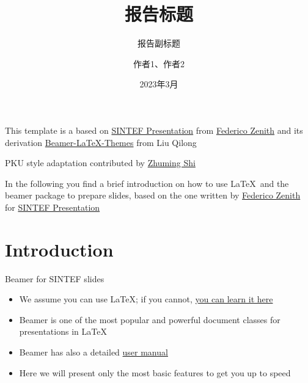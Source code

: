 \documentclass{beamer}
\title{报告标题}
\subtitle{报告副标题}
\author{作者1、作者2}
\date{2023年3月}
\newcommand{\hrefcol}[2]{\textcolor{cyan}{\href{#1}{#2}}}
\begin{document}
\maketitle

\begin{frame}

This template is a based on \hrefcol{https://www.overleaf.com/latex/templates/sintef-presentation/jhbhdffczpnx}{SINTEF Presentation} from \hrefcol{mailto:federico.zenith@sintef.no}{Federico Zenith} and its derivation \hrefcol{https://github.com/TOB-KNPOB/Beamer-LaTeX-Themes}{Beamer-LaTeX-Themes} from Liu Qilong

\vspace{\baselineskip}

PKU style adaptation contributed by \hrefcol{https://shizhuming.github.io}{Zhuming Shi}

\vspace{\baselineskip}

In the following you find a brief introduction on how to use \LaTeX\ and the beamer package to prepare slides, based on the one written by \hrefcol{mailto:federico.zenith@sintef.no}{Federico Zenith} for \hrefcol{https://www.overleaf.com/latex/templates/sintef-presentation/jhbhdffczpnx}{SINTEF Presentation}

\end{frame}

\section{Introduction}

\begin{frame}{Beamer for SINTEF slides}
\begin{itemize}
\item We assume you can use \LaTeX; if you cannot,
\hrefcol{http://en.wikibooks.org/wiki/LaTeX/}{you can learn it here}
\item Beamer is one of the most popular and powerful document
classes for presentations in \LaTeX
\item Beamer has also a detailed
\hrefcol{http://www.ctan.org/tex-archive/macros/latex/contrib/beamer/doc/beameruserguide.pdf}{user
 manual}
\item Here we will present only the most basic features to get you up to speed
\end{itemize}
\end{frame}
\end{document}
